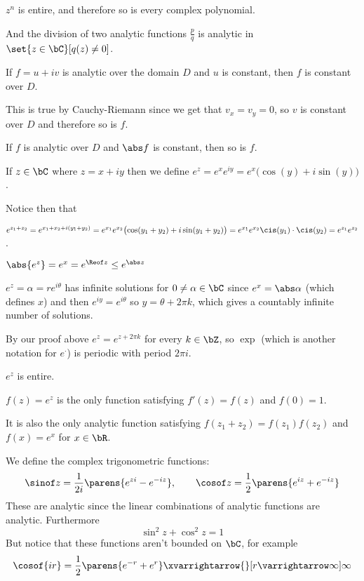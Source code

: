 \documentclass[10pt]{article}
\begin{document}
$z^n$ is entire, and therefore so is every complex polynomial.

And the division of two analytic functions $\frac pq$ is analytic in $\set{z\in\bC}[q(z)\neq0]$.

\begin{prop*}

    If $f=u+iv$ is analytic over the domain $D$ and $u$ is constant, then $f$ is constant over $D$.

\end{prop*}

This is true by Cauchy-Riemann since we get that $v_x=v_y=0$, so $v$ is constant over $D$ and therefore so is $f$.

\begin{prop*}

    If $f$ is analytic over $D$ and $\abs f$ is constant, then so is $f$.

\end{prop*}

\begin{defn*}

    If $z\in\bC$ where $z=x+iy$ then we define $e^z=e^xe^{iy}=e^x\bigl(\cos(y)+i\sin(y)\bigr)$.

\end{defn*}

Notice then that

\benum
    \item $e^{z_1+z_2}=e^{x_1+x_2+i(y_1+y_2)}=e^{x_1}e^{x_2}\bigl(\cos(y_1+y_2)+i\sin(y_1+y_2)\bigr)=e^{x_1}e^{x_2}\cis(y_1)\cdot\cis(y_2)=e^{z_1}e^{z_2}$.
    \item $\abs{e^z}=e^x=e^{\Reof z}\leq e^{\abs z}$
    \item $e^z=\alpha=re^{i\theta}$ has infinite solutions for $0\neq\alpha\in\bC$ since $e^x=\abs\alpha$ (which defines $x$) and then $e^{iy}=e^{i\theta}$ so $y=\theta+2\pi k$, which gives a countably
    infinite number of solutions.
    \item By our proof above $e^z=e^{z+2\pi k}$ for every $k\in\bZ$, so $\exp$ (which is another notation for $e^{\textstyle\cdot}$) is periodic with period $2\pi i$.
    \item $e^z$ is entire.
    \item $f(z)=e^z$ is the only function satisfying $f'(z)=f(z)$ and $f(0)=1$.
    \item It is also the only analytic function satisfying $f(z_1+z_2)=f(z_1)f(z_2)$ and $f(x)=e^x$ for $x\in\bR$.
\eenum

We define the complex trigonometric functions:
\[ \sinof z = \frac1{2i}\parens{e^{zi}-e^{-iz}},\qquad \cosof z = \frac12\parens{e^{iz}+e^{-iz}} \]
These are analytic since the linear combinations of analytic functions are analytic.
Furthermore
\[ \sin^2 z + \cos^2 z = 1 \]
But notice that these functions aren't bounded on $\bC$, for example
\[ \cosof{ir} = \frac12\parens{e^{-r}+e^r} \xvarrightarrow{}[r\varrightarrow\infty]\infty \]
\end{document}
